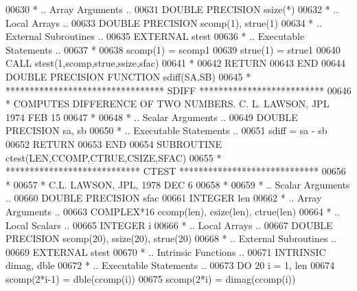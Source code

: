 \begin{DoxyCode}
00630 \textcolor{comment}{*     .. Array Arguments ..}
00631       \textcolor{keywordtype}{DOUBLE PRECISION}  ssize(*)
00632 \textcolor{comment}{*     .. Local Arrays ..}
00633       \textcolor{keywordtype}{DOUBLE PRECISION}  scomp(1), strue(1)
00634 \textcolor{comment}{*     .. External Subroutines ..}
00635       \textcolor{keywordtype}{EXTERNAL}          stest
00636 \textcolor{comment}{*     .. Executable Statements ..}
00637 \textcolor{comment}{*}
00638       scomp(1) = scomp1
00639       strue(1) = strue1
00640       \textcolor{keyword}{CALL }stest(1,scomp,strue,ssize,sfac)
00641 \textcolor{comment}{*}
00642       \textcolor{keywordflow}{RETURN}
00643 \textcolor{keyword}{      END}
00644 \textcolor{keyword}{      DOUBLE PRECISION }\textcolor{keyword}{FUNCTION }sdiff(SA,SB)
00645 \textcolor{comment}{*     ********************************* SDIFF **************************}
00646 \textcolor{comment}{*     COMPUTES DIFFERENCE OF TWO NUMBERS.  C. L. LAWSON, JPL 1974 FEB 15}
00647 \textcolor{comment}{*}
00648 \textcolor{comment}{*     .. Scalar Arguments ..}
00649       \textcolor{keywordtype}{DOUBLE PRECISION}                sa, sb
00650 \textcolor{comment}{*     .. Executable Statements ..}
00651       sdiff = sa - sb
00652       \textcolor{keywordflow}{RETURN}
00653 \textcolor{keyword}{      END}
00654 \textcolor{keyword}{      SUBROUTINE }ctest(LEN,CCOMP,CTRUE,CSIZE,SFAC)
00655 \textcolor{comment}{*     **************************** CTEST *****************************}
00656 \textcolor{comment}{*}
00657 \textcolor{comment}{*     C.L. LAWSON, JPL, 1978 DEC 6}
00658 \textcolor{comment}{*}
00659 \textcolor{comment}{*     .. Scalar Arguments ..}
00660       \textcolor{keywordtype}{DOUBLE PRECISION} sfac
00661       \textcolor{keywordtype}{INTEGER}          len
00662 \textcolor{comment}{*     .. Array Arguments ..}
00663       \textcolor{keywordtype}{COMPLEX*16}       ccomp(len), csize(len), ctrue(len)
00664 \textcolor{comment}{*     .. Local Scalars ..}
00665       \textcolor{keywordtype}{INTEGER}          i
00666 \textcolor{comment}{*     .. Local Arrays ..}
00667       \textcolor{keywordtype}{DOUBLE PRECISION} scomp(20), ssize(20), strue(20)
00668 \textcolor{comment}{*     .. External Subroutines ..}
00669       \textcolor{keywordtype}{EXTERNAL}         stest
00670 \textcolor{comment}{*     .. Intrinsic Functions ..}
00671       \textcolor{keywordtype}{INTRINSIC}        dimag, dble
00672 \textcolor{comment}{*     .. Executable Statements ..}
00673       \textcolor{keywordflow}{DO} 20 i = 1, len
00674          scomp(2*i-1) = dble(ccomp(i))
00675          scomp(2*i) = dimag(ccomp(i))

\end{DoxyCode}
